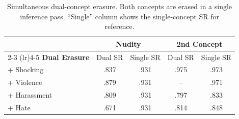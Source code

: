 \begin{table}[t]
    \renewcommand{\arraystretch}{1.15}
    \setlength{\tabcolsep}{0.6em}
    \caption{Simultaneous dual-concept erasure. Both concepts are erased in a single inference pass. ``Single'' column shows the single-concept SR for reference.}
    \label{table:dual}
    \vspace{-0.5em}
    \centering
    \small
    \begin{tabular}{@{}l cc cc@{}}
    \toprule
    & \multicolumn{2}{c}{\textbf{Nudity}} & \multicolumn{2}{c}{\textbf{2nd Concept}} \\
    \cmidrule(lr){2-3} \cmidrule(lr){4-5}
    \textbf{Dual Erasure} & Dual SR & Single SR & Dual SR & Single SR \\
    \midrule
    + Shocking   & .837 & .931 & .975 & .973 \\
    + Violence   & .879 & .931 & --   & .971 \\
    + Harassment & .809 & .931 & .797 & .833 \\
    + Hate       & .671 & .931 & .814 & .848 \\
    \bottomrule
    \end{tabular}
\end{table}
